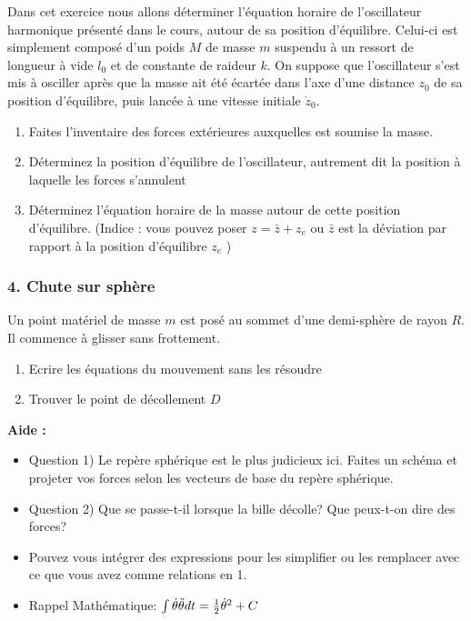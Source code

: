 \documentclass[a4paper,10pt,twoside]{article}
\begin{document}
Dans cet exercice nous allons déterminer l'équation horaire de l'oscillateur harmonique présenté dans le cours, autour de sa position d'équilibre. Celui-ci est simplement composé d'un poids $M$ de masse $m$ suspendu à un ressort de longueur à vide $l_0$ et de constante de raideur $k$. On suppose que l'oscillateur s'est mis à osciller après que la masse ait été écartée dans l'axe d'une distance $z_0$ de sa position d'équilibre, puis lancée à une vitesse initiale $\dot z_0$.
\begin{enumerate}
    \item Faites l'inventaire des forces extérieures auxquelles est soumise la masse.
    \item Déterminez la position d'équilibre de l'oscillateur, autrement dit la position à laquelle les forces s'annulent
    \item Déterminez l'équation horaire de la masse autour de cette position d'équilibre. (Indice : vous pouvez poser $z = \bar z + z_e$ ou $\bar z$ est la déviation par rapport à la position d'équilibre $z_e$ )
\end{enumerate}

\subsubsection*{4. Chute sur sphère}
Un point matériel de masse $m$ est posé au sommet d'une demi-sphère de rayon $R$. Il commence à glisser sans frottement.
\begin{enumerate}
    \item Ecrire les équations du mouvement sans les résoudre
    \item Trouver le point de décollement $D$
\end{enumerate}

 \par\leavevmode\par
 \textbf{Aide :} 
 \begin{itemize}
     
 \item Question 1)  Le repère sphérique est le plus judicieux ici. Faites un schéma et projeter vos forces selon les vecteurs de base du repère sphérique.
 
 \item Question 2) Que se passe-t-il lorsque la bille décolle? Que peux-t-on dire des forces? 
 \item Pouvez vous intégrer des expressions pour les simplifier ou les remplacer avec ce que vous avez comme relations en 1. 
 \item Rappel Mathématique: $\int \dot \theta \Ddot{\theta} dt = \frac{1}{2} \Dot{\theta}^2 + C$
 \end{itemize}
 
\end{document}
